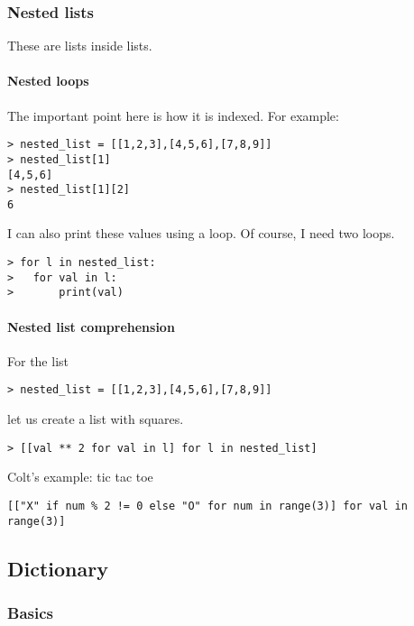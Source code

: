 \subsubsection{Nested lists}

These are lists inside lists.

\paragraph{Nested loops} The important point here is how it is indexed. For example:
\begin{verbatim}    
> nested_list = [[1,2,3],[4,5,6],[7,8,9]]
> nested_list[1]
[4,5,6]
> nested_list[1][2]
6
\end{verbatim}
I can also print these values using a loop. Of course, I need two loops. 
\begin{verbatim}
> for l in nested_list:
> 	for val in l:
> 		print(val)
\end{verbatim}

\paragraph{Nested list comprehension} For the list
\begin{verbatim}
> nested_list = [[1,2,3],[4,5,6],[7,8,9]]
\end{verbatim}
let us create a list with squares.
\begin{verbatim}
> [[val ** 2 for val in l] for l in nested_list]
\end{verbatim}

Colt's example: tic tac toe
\begin{verbatim}
[["X" if num % 2 != 0 else "O" for num in range(3)] for val in range(3)]
\end{verbatim}


\subsection{Dictionary}

\subsubsection{Basics}

